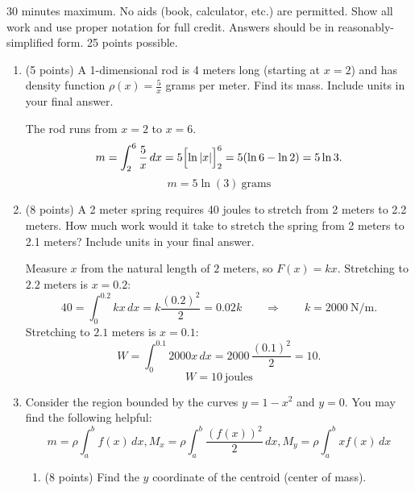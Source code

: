 \documentclass[12pt]{article}
\newcommand{\ds}{\displaystyle}
\begin{document}
30 minutes maximum.  No aids (book, calculator, etc.) are permitted.
Show all work and use proper notation for full credit.  Answers should
be in reasonably-simplified form.  25 points possible.

\begin{enumerate}
\item (5 points) A 1-dimensional rod is 4 meters long (starting at
  $x=2$) and
  has density function $\rho(x) = \frac{5}{x}$ grams per meter. Find its
  mass. Include units in your final answer.

\begin{solution}
The rod runs from $x=2$ to $x=6$.
\[
m=\int_2^6 \frac{5}{x}\,dx=5\Bigl[\ln|x|\Bigr]_2^6=5(\ln 6-\ln 2)=5\ln 3 .
\]
\[
\boxed{\ m=5\ln(3)\ \text{grams}\ }
\]
\end{solution}

\item (8 points) A 2 meter spring requires 40 joules to stretch from 2
  meters to 2.2 meters. How much work would it take to stretch the
  spring from 2 meters to 2.1 meters? Include units in your final
  answer.

\begin{solution}
Measure $x$ from the natural length of $2$ meters, so $F(x)=kx$.  Stretching to
$2.2$ meters is $x=0.2$:
\[
40=\int_0^{0.2} kx\,dx=k\frac{(0.2)^2}{2}=0.02k
\qquad\Longrightarrow\qquad
k=2000 \ \text{N/m}.
\]
Stretching to $2.1$ meters is $x=0.1$:
\[
W=\int_0^{0.1} 2000x\,dx=2000\,\frac{(0.1)^2}{2}=10 .
\]
\[
\boxed{\ W=10\ \text{joules}\ }
\]
\end{solution}

  \newpage

\item Consider
  the region bounded by the curves $\ds y=1-x^2$ and $y=0$.
  You may find the following helpful:
  $$
  m=\rho \int_a^b f(x) \, dx, M_x = \rho \int_a^b \frac{(f(x))^2}{2} \, dx , M_y = \rho \int_a^b xf(x) \, dx
  $$
  \begin{enumerate}
  \item (8 points) Find the $y$ coordinate of the centroid (center of
    mass).


\end{enumerate}
\end{enumerate}
\end{document}
